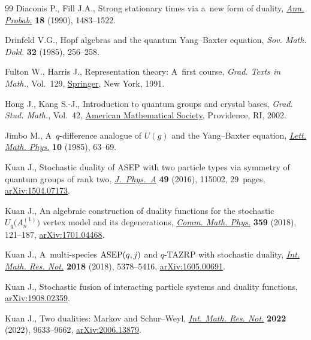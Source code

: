 \documentclass[10pt,a4paper]{amsart}
\numberwithin{equation}{section}
\theoremstyle{definition}
\def\mathcal#1{#1}
\def\mathfrak#1{#1}
\begin{document}
\begin{thebibliography}{99}
Diaconis P., Fill J.A., Strong stationary times via a~new form of duality,
 \href{https://doi.org/10.1214/aop/1176990628}{\textit{Ann. Probab.}}
 \textbf{18} (1990), 1483--1522.

Drinfeld V.G., Hopf algebras and the quantum {Y}ang--{B}axter equation,
 \textit{Sov. Math. Dokl.} \textbf{32} (1985), 256--258.

Fulton W., Harris J., Representation theory: {A}~first course, \textit{Grad.
 Texts in Math.}, Vol.~129,
 \href{https://doi.org/10.1007/978-1-4612-0979-9}{Springer}, New York, 1991.

Hong J., Kang S.-J., Introduction to quantum groups and crystal bases,
 \textit{Grad. Stud. Math.}, Vol.~42,
 \href{https://doi.org/10.1090/gsm/042}{American Mathematical Society},
 Providence, RI, 2002.

Jimbo M., A~{$q$}-difference analogue of {$U({\mathfrak g})$} and the
 {Y}ang--{B}axter equation,
 \href{https://doi.org/10.1007/BF00704588}{\textit{Lett. Math. Phys.}}
 \textbf{10} (1985), 63--69.

Kuan J., Stochastic duality of {ASEP} with two particle types via symmetry of
 quantum groups of rank two,
 \href{https://doi.org/10.1088/1751-8113/49/11/115002}{\textit{J.~Phys.~A}}
 \textbf{49} (2016), 115002, 29~pages,
 \href{https://arxiv.org/abs/1504.07173}{arXiv:1504.07173}.

Kuan J., An algebraic construction of duality functions for the stochastic
 {$\mathcal{U}_q\bigl( A_n^{(1)}\bigr)$} vertex model and its degenerations,
 \href{https://doi.org/10.1007/s00220-018-3108-x}{\textit{Comm. Math. Phys.}}
 \textbf{359} (2018), 121--187,
 \href{https://arxiv.org/abs/1701.04468}{arXiv:1701.04468}.

Kuan J., A~multi-species {${\rm ASEP}(q,j)$} and {$q$}-{TAZRP} with stochastic
 duality, \href{https://doi.org/10.1093/imrn/rnx034}{\textit{Int. Math. Res.
 Not.}} \textbf{2018} (2018), 5378--5416,
 \href{https://arxiv.org/abs/1605.00691}{arXiv:1605.00691}.

Kuan J., Stochastic fusion of interacting particle systems and duality
 functions, \href{https://arxiv.org/abs/1908.02359}{arXiv:1908.02359}.

Kuan J., Two dualities: {M}arkov and {S}chur--{W}eyl,
 \href{https://doi.org/10.1093/imrn/rnaa333}{\textit{Int. Math. Res. Not.}}
 \textbf{2022} (2022), 9633--9662,
 \href{https://arxiv.org/abs/2006.13879}{arXiv:2006.13879}.


\end{thebibliography}
\end{document}
